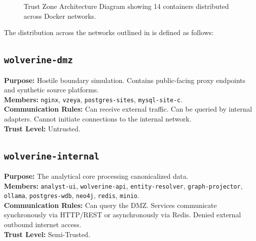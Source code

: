 \begin{figure}[htbp]
{
}
\caption{Trust Zone Architecture Diagram showing 14 containers distributed across Docker networks.}
\label{fig:trust-architecture}
\end{figure}

The distribution across the networks outlined in  is defined as follows:

\subsection{\texttt{wolverine-dmz}}
\textbf{Purpose:} Hostile boundary simulation. Contains public-facing proxy endpoints and synthetic source platforms. \\
\textbf{Members:} \texttt{nginx}, \texttt{vzeya}, \texttt{postgres-sites}, \texttt{mysql-site-c}. \\
\textbf{Communication Rules:} Can receive external traffic. Can be queried by internal adapters. Cannot initiate connections to the internal network. \\
\textbf{Trust Level:} Untrusted.

\subsection{\texttt{wolverine-internal}}
\textbf{Purpose:} The analytical core processing canonicalized data. \\
\textbf{Members:} \texttt{analyst-ui}, \texttt{wolverine-api}, \texttt{entity-resolver}, \texttt{graph-projector}, \texttt{ollama}, \texttt{postgres-wdb}, \texttt{neo4j}, \texttt{redis}, \texttt{minio}. \\
\textbf{Communication Rules:} Can query the DMZ. Services communicate synchronously via HTTP/REST or asynchronously via Redis. Denied external outbound internet access. \\
\textbf{Trust Level:} Semi-Trusted.

